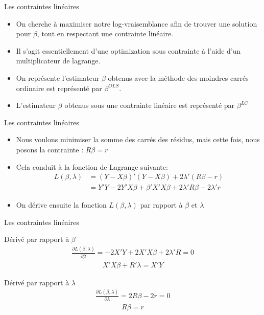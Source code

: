 \documentclass{beamer}
\begin{document}
\begin{frame}{Les contraintes linéaires}
\begin{itemize}
\item On cherche à maximiser notre log-vraisemblance afin de trouver une solution pour $\beta$, tout en respectant une contrainte linéaire. 
\item Il s'agit essentiellement d'une optimization sous contrainte à l'aide d'un multiplicateur de lagrange.
\item On représente l'estimateur $\beta$ obtenus avec la méthode des moindres carrés ordinaire est représenté par $\beta^{OLS}$.
\item L'estimateur $\beta$ obtenus sous une contrainte linéaire est représenté par $\beta^{LC}$

\end{itemize}
\end{frame}

\begin{frame}{Les contraintes linéaires}
\begin{itemize}
\item Nous voulons minimiser la somme des carrés des résidus, mais cette fois, nous posons la contrainte : $R \beta = r$
\item Cela conduit à la fonction de Lagrange suivante:
\begin{align*}
L(\beta,\lambda) & =(Y-X\beta)'(Y-X\beta)+2 \lambda'(R \beta-r)\\ & = Y'Y-2Y'X\beta +\beta' X'X \beta +2 \lambda' R\beta -2 \lambda'r
\end{align*}
\item On dérive ensuite la fonction $L(\beta,\lambda)$ par rapport à $\beta$ et $\lambda$
\end{itemize}

\end{frame}

\begin{frame}{Les contraintes linéaires}
\begin{block}{Dérivé par rapport à $\beta$}
\begin{align*}
\frac{\partial L(\beta, \lambda)}{\partial \beta}=-2 X'Y+2X'X \beta+2 \lambda'R=0
\end{align*}
\begin{align*}
X'X \beta + R'\lambda = X'Y
\end{align*}
\end{block}
\begin{block}{Dérivé par rapport à $\lambda$}
\begin{align*}
\frac{\partial L(\beta, \lambda)}{\partial \lambda}=2R\beta-2r=0
\end{align*}
\begin{align*}
R \beta=r
\end{align*}
\end{block}
\end{frame}
\end{document}
